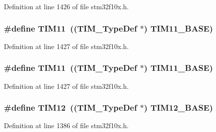 Definition at line 1426 of file stm32f10x.\+h.

\subsubsection[{\texorpdfstring{T\+I\+M11}{TIM11}}]{\setlength{\rightskip}{0pt plus 5cm}\#define T\+I\+M11~(({\bf T\+I\+M\+\_\+\+Type\+Def} $\ast$) {\bf T\+I\+M11\+\_\+\+B\+A\+SE})}\hypertarget{group___peripheral__declaration_gacfd11ef966c7165f57e2cebe0abc71ad}{}\label{group___peripheral__declaration_gacfd11ef966c7165f57e2cebe0abc71ad}


Definition at line 1427 of file stm32f10x.\+h.

\subsubsection[{\texorpdfstring{T\+I\+M11}{TIM11}}]{\setlength{\rightskip}{0pt plus 5cm}\#define T\+I\+M11~(({\bf T\+I\+M\+\_\+\+Type\+Def} $\ast$) {\bf T\+I\+M11\+\_\+\+B\+A\+SE})}\hypertarget{group___peripheral__declaration_gacfd11ef966c7165f57e2cebe0abc71ad}{}\label{group___peripheral__declaration_gacfd11ef966c7165f57e2cebe0abc71ad}


Definition at line 1427 of file stm32f10x.\+h.

\subsubsection[{\texorpdfstring{T\+I\+M12}{TIM12}}]{\setlength{\rightskip}{0pt plus 5cm}\#define T\+I\+M12~(({\bf T\+I\+M\+\_\+\+Type\+Def} $\ast$) {\bf T\+I\+M12\+\_\+\+B\+A\+SE})}\hypertarget{group___peripheral__declaration_ga2397f8a0f8e7aa10cf8e8c049e431e53}{}\label{group___peripheral__declaration_ga2397f8a0f8e7aa10cf8e8c049e431e53}


Definition at line 1386 of file stm32f10x.\+h.


